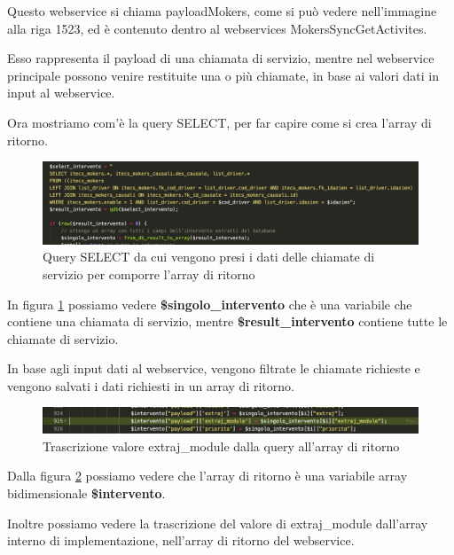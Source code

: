 	Questo webservice si chiama payloadMokers, come si può vedere nell'immagine alla riga 1523, ed è contenuto dentro al webservices MokersSyncGetActivites.
	\newspace
	
	Esso rappresenta il payload di una chiamata di servizio, mentre nel webservice principale possono venire restituite una o più chiamate, in base ai valori dati in input al webservice.


\newpage

\newspace

	Ora mostriamo com'è la query SELECT, per far capire come si crea l'array di ritorno.


\begin{figure}[!h] 
	\centering
	\includegraphics[scale = 0.4]{immagini/webservices/ampliamenti/3ampl__nontoccata_query_select.png}
	\caption{Query SELECT da cui vengono presi i dati delle chiamate di servizio per comporre l'array di ritorno}
	\label{fig:5-9}
\end{figure}
\newspace
In figura \ref{fig:5-9} possiamo vedere \textbf{\$singolo\_intervento} che è una variabile che contiene una chiamata di servizio, mentre \textbf{\$result\_intervento} contiene tutte le chiamate di servizio.

In base agli input dati al webservice, vengono filtrate le chiamate richieste e vengono salvati i dati richiesti in un array di ritorno.
\newspace
\begin{figure}[!h] 
	\centering
	\includegraphics[scale = 0.5]{immagini/webservices/ampliamenti/3ampl__correzione_functionmokers.png}
	\caption{Trascrizione valore extraj\_module dalla query all'array di ritorno}
	\label{fig:5-10}
\end{figure}
\newspace


	Dalla figura \ref{fig:5-10} possiamo vedere che l'array di ritorno è una variabile array bidimensionale \textbf{\$intervento}.
	\newspace
	
	Inoltre possiamo vedere la trascrizione del valore di extraj\_module dall'array interno di implementazione, nell'array di ritorno del webservice.
	
